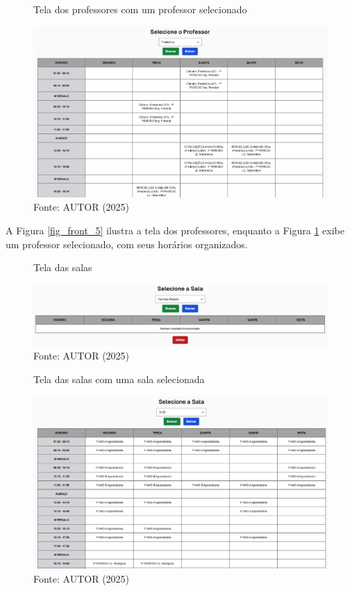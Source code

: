 \begin{figure}[H]
    \centering
    \caption{Tela dos professores com um professor selecionado}
    \includegraphics[width=1\textwidth]{Figuras/front-6.png}
    \caption*{Fonte: AUTOR (2025)}
    \label{fig_front_6}
\end{figure}

A Figura \ref{fig_front_5} ilustra a tela dos professores, enquanto a Figura \ref{fig_front_6} exibe um professor selecionado, com seus horários organizados.

\begin{figure}[H]
    \centering
    \caption{Tela das salas}
    \includegraphics[width=1\textwidth]{Figuras/front-7.png}
    \caption*{Fonte: AUTOR (2025)}
    \label{fig_front_7}
\end{figure}

\begin{figure}[htb]
    \centering
    \caption{Tela das salas com uma sala selecionada}
    \includegraphics[width=1\textwidth]{Figuras/front-8.png}
    \caption*{Fonte: AUTOR (2025)}
    \label{fig_front_8}
\end{figure}

